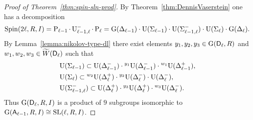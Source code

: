 \begin{proof}[Proof of Theorem~\ref{thm:spin-sln-prod}]
By Theorem~\ref{thm:DennisVaserstein} one has a decomposition
\[ \operatorname{Spin}(2\ell,R,I) = \operatorname{P}_{\ell-1}\cdot\operatorname{U}_{\ell-1,\ell}^-\cdot\operatorname{P}_{\ell} = \operatorname{G}(\Delta_{\ell-1})\cdot\operatorname{U}(\Sigma_{\ell-1})\cdot\operatorname{U}(\Sigma_{\ell-1,\ell}^-)\cdot\operatorname{U}(\Sigma_{\ell})\cdot\operatorname{G}(\Delta_\ell). \]
By Lemma~\ref{lemma:nikolov-type-dl} there exist elements $y_1,y_2,y_3\in\operatorname{G}(\mathsf{D}_\ell,R)$ and $w_1,w_2,w_3\in\widetilde{W}(\mathsf{D}_\ell)$ such that
\begin{align*}
& \operatorname{U}(\Sigma_{\ell-1}) \subset \operatorname{U}(\Delta_{\ell-1}^-) \cdot {}^{y_1}\!\operatorname{U}(\Delta_{\ell-1}^-) \cdot {}^{w_1}\!\operatorname{U}(\Delta_{\ell-1}^+), \\
& \operatorname{U}(\Sigma_\ell) \subset {}^{w_2}\!\operatorname{U}(\Delta_\ell^+) \cdot {}^{y_2}\!\operatorname{U}(\Delta_\ell^-) \cdot \operatorname{U}(\Delta_\ell^-), \\
& \operatorname{U}(\Sigma_{\ell-1,\ell}^-) \subset \operatorname{U}(\Delta_\ell^+) \cdot {}^{y_3}\!\operatorname{U}(\Delta_\ell^+) \cdot {}^{w_3}\!\operatorname{U}(\Delta_\ell^-).
\end{align*}
Thus $\operatorname{G}(\mathsf{D}_\ell,R,I)$ is a product of $9$ subgroups isomorphic to $\operatorname{G}(\mathsf{A}_{\ell-1},R,I)\cong\operatorname{SL}(\ell,R,I)$.
\end{proof}